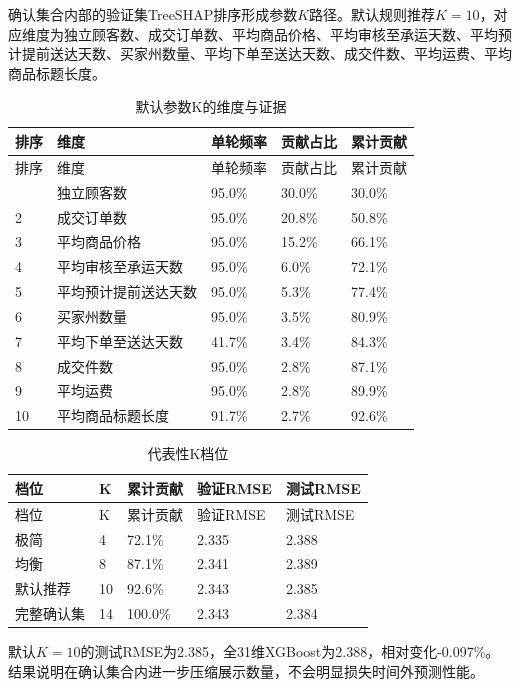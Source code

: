 \documentclass{sufethesismas}
\begin{document}
确认集合内部的验证集TreeSHAP排序形成参数\(K\)路径。默认规则推荐\(K=10\)，对应维度为独立顾客数、成交订单数、平均商品价格、平均审核至承运天数、平均预计提前送达天数、买家州数量、平均下单至送达天数、成交件数、平均运费、平均商品标题长度。

\begin{longtable}[]{@{}lllll@{}}
\caption{默认参数K的维度与证据}\tabularnewline
\toprule\noalign{}
排序 & 维度 & 单轮频率 & 贡献占比 & 累计贡献 \\
\midrule\noalign{}
\endfirsthead
\toprule\noalign{}
排序 & 维度 & 单轮频率 & 贡献占比 & 累计贡献 \\
\midrule\noalign{}
\endhead
\bottomrule\noalign{}
\endlastfoot
1 & 独立顾客数 & 95.0\% & 30.0\% & 30.0\% \\
2 & 成交订单数 & 95.0\% & 20.8\% & 50.8\% \\
3 & 平均商品价格 & 95.0\% & 15.2\% & 66.1\% \\
4 & 平均审核至承运天数 & 95.0\% & 6.0\% & 72.1\% \\
5 & 平均预计提前送达天数 & 95.0\% & 5.3\% & 77.4\% \\
6 & 买家州数量 & 95.0\% & 3.5\% & 80.9\% \\
7 & 平均下单至送达天数 & 41.7\% & 3.4\% & 84.3\% \\
8 & 成交件数 & 95.0\% & 2.8\% & 87.1\% \\
9 & 平均运费 & 95.0\% & 2.8\% & 89.9\% \\
10 & 平均商品标题长度 & 91.7\% & 2.7\% & 92.6\% \\
\end{longtable}

\begin{longtable}[]{@{}lllll@{}}
\caption{代表性K档位}\tabularnewline
\toprule\noalign{}
档位 & K & 累计贡献 & 验证RMSE & 测试RMSE \\
\midrule\noalign{}
\endfirsthead
\toprule\noalign{}
档位 & K & 累计贡献 & 验证RMSE & 测试RMSE \\
\midrule\noalign{}
\endhead
\bottomrule\noalign{}
\endlastfoot
极简 & 4 & 72.1\% & 2.335 & 2.388 \\
均衡 & 8 & 87.1\% & 2.341 & 2.389 \\
默认推荐 & 10 & 92.6\% & 2.343 & 2.385 \\
完整确认集 & 14 & 100.0\% & 2.343 & 2.384 \\
\end{longtable}

默认\(K=10\)的测试RMSE为2.385，全31维XGBoost为2.388，相对变化-0.097\%。结果说明在确认集合内进一步压缩展示数量，不会明显损失时间外预测性能。
\end{document}
